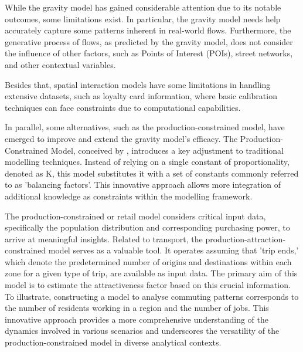     While the gravity model has gained considerable attention due to its notable outcomes, some limitations exist. In particular, the gravity model needs help accurately capture some patterns inherent in real-world flows\citep{wilkinsonSpatialInteractionModels2023}. Furthermore, the generative process of flows, as predicted by the gravity model, does not consider the influence of other factors, such as Points of Interest (POIs), street networks, and other contextual variables\citep{lucaSurveyDeepLearning2021}.

    Besides that, spatial interaction models have some limitations in handling extensive datasets, such as loyalty card information, where basic calibration techniques can face constraints due to computational capabilities. \citep{wilkinsonSpatialInteractionModels2023}
    
    In parallel, some alternatives, such as the production-constrained model, have emerged to improve and extend the gravity model's efficacy. The Production-Constrained Model, conceived by \cite{wilsonFamilySpatialInteraction1971b}, introduces a key adjustment to traditional modelling techniques. Instead of relying on a single constant of proportionality, denoted as K, this model substitutes it with a set of constants commonly referred to as 'balancing factors'. This innovative approach allows more integration of additional knowledge as constraints within the modelling framework.

    The production-constrained or retail model considers critical input data, specifically the population distribution and corresponding purchasing power, to arrive at meaningful insights\citep{wilsonFamilySpatialInteraction1971b}. Related to transport, the production-attraction-constrained model serves as a valuable tool. It operates assuming that 'trip ends,' which denote the predetermined number of origins and destinations within each zone for a given type of trip, are available as input data. The primary aim of this model is to estimate the attractiveness factor based on this crucial information. To illustrate, constructing a model to analyse commuting patterns corresponds to the number of residents working in a region and the number of jobs\citep{wilsonFamilySpatialInteraction1971b}. This innovative approach provides a more comprehensive understanding of the dynamics involved in various scenarios and underscores the versatility of the production-constrained model in diverse analytical contexts\citep{poolerExtendedFamilySpatial1994a, wilkinsonSpatialInteractionModels2023, wilsonFamilySpatialInteraction1971b}.



